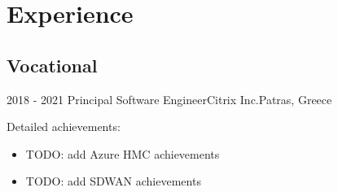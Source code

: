 \documentclass[10pt,a4paper]{moderncv}        %
\begin{document}
\makecvtitle

\section{Experience}

\subsection{Vocational}

\cventry
{2018 - 2021}
{Principal Software Engineer}{Citrix Inc.}{Patras, Greece}{}
 {%
Detailed achievements:%
\begin{itemize}
  \item
TODO: add Azure HMC achievements
  \item
TODO: add SDWAN achievements
\end{itemize}}
\end{document}
